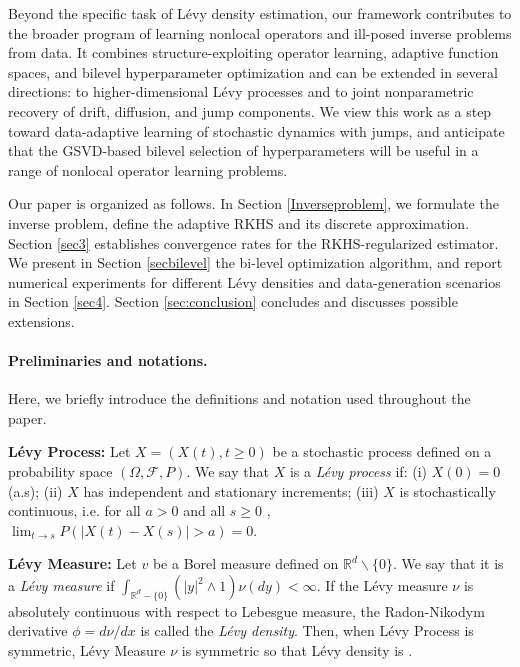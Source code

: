 \documentclass[12pt]{article}
\numberwithin{equation}{section}
\numberwithin{theorem}{section}
\begin{document}
Beyond the specific task of L\'evy density estimation, our framework contributes to the broader program of learning nonlocal operators and ill-posed inverse problems from data. It combines structure-exploiting operator learning, adaptive function spaces, and bilevel hyperparameter optimization and can be extended in several directions: to higher-dimensional L\'evy processes and to joint nonparametric recovery of drift, diffusion, and jump components. We view this work as a step toward data-adaptive learning of stochastic dynamics with jumps, and anticipate that the GSVD-based bilevel selection of hyperparameters will be useful in a range of nonlocal operator learning problems. 

Our paper is organized as follows. In Section \ref{Inverseproblem}, we formulate the inverse problem, define the adaptive RKHS and its discrete approximation. Section \ref{sec3} establishes convergence rates for the RKHS-regularized estimator. We present in Section \ref{secbilevel} the bi-level optimization algorithm, and report numerical experiments for different L\'evy densities and data-generation scenarios in Section \ref{sec4}. Section \ref{sec:conclusion} concludes and discusses possible extensions. 




\paragraph{Preliminaries and notations.} Here, we briefly introduce the definitions and notation used throughout the paper.

\noindent\textbf{L\'evy Process: }
Let  $X=(X(t), t \geq 0)$  be a stochastic process defined on a probability space  $(\Omega, \mathcal{F}, P)$. We say that  $X$ is a \emph{L\'evy process} if:
(i)  $X(0)=0$  (a.s);
(ii)  $X$  has independent and stationary increments;
(iii)  $X$  is stochastically continuous, i.e. for all  $a>0$  and all  $s \geq 0$ , $\lim _{t \rightarrow s} P(|X(t)-X(s)|>a)=0$.

\noindent\textbf{L\'evy Measure: }
Let $v$ be a Borel measure defined on $\mathbb{R}^d \backslash\{0\}$. We say that it is a \emph{L\'evy measure} if $\int_{\mathbb{R}^d-\{0\}}\left(|y|^2 \wedge 1\right) \nu(d y)<\infty.$ If the L\'evy measure $\nu$ is absolutely continuous with respect to Lebesgue measure, the Radon-Nikodym derivative $\phi=d \nu / d x$ is called the \emph{L\'evy density}. Then, when L\'evy Process is symmetric, L\'evy Measure $\nu$ is symmetric so that  L\'evy density is .
\end{document}
